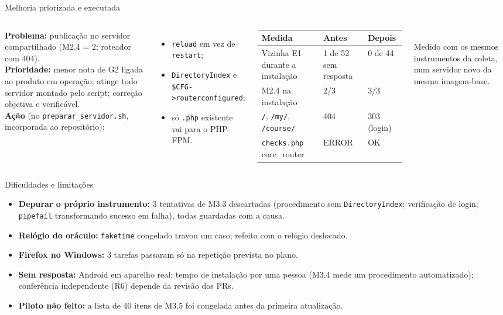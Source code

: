 \documentclass[aspectratio=169,10pt]{beamer}
\begin{document}
\begin{frame}{Melhoria priorizada e executada}
\begin{columns}[T]
\small
\textbf{Problema:} publicação no servidor compartilhado (M2.4 = 2; roteador com 404).\\[0.3em]
\textbf{Prioridade:} menor nota de G2 ligada ao produto em operação; atinge todo servidor montado pelo script; correção objetiva e verificável.\\[0.3em]
\textbf{Ação} (no \texttt{preparar\_servidor.sh}, incorporada ao repositório):
\begin{itemize}\scriptsize
\item \texttt{reload} em vez de \texttt{restart};
\item \texttt{DirectoryIndex} e \texttt{\$CFG->routerconfigured};
\item só \texttt{.php} existente vai para o PHP-FPM.
\end{itemize}
\scriptsize
\begin{tabularx}{\linewidth}{Lp{1.8cm}p{1.8cm}}
\toprule
Medida & Antes & Depois \\
\midrule
Vizinha E1 durante a instalação & 1 de 52 sem resposta & 0 de 44 \\
M2.4 na instalação & 2/3 & 3/3 \\
\texttt{/}, \texttt{/my/}, \texttt{/course/} & 404 & 303 (login) \\
\texttt{checks.php} core\_router & ERROR & OK \\
\bottomrule
\end{tabularx}\\[0.4em]
Medido com os mesmos instrumentos da coleta, num servidor novo da mesma imagem-base.
\end{columns}
\end{frame}

\begin{frame}{Dificuldades e limitações}
\small
\begin{itemize}
\item \textbf{Depurar o próprio instrumento:} 3 tentativas de M3.3 descartadas (procedimento sem \texttt{DirectoryIndex}; verificação de login; \texttt{pipefail} transformando sucesso em falha), todas guardadas com a causa.
\item \textbf{Relógio do oráculo:} \texttt{faketime} congelado travou um caso; refeito com o relógio deslocado.
\item \textbf{Firefox no Windows:} 3 tarefas passaram só na repetição prevista no plano.
\item \textbf{Sem resposta:} Android em aparelho real; tempo de instalação por uma pessoa (M3.4 mede um procedimento automatizado); conferência independente (R6) depende da revisão dos PRs.
\item \textbf{Piloto não feito:} a lista de 40 itens de M3.5 foi congelada antes da primeira atualização.
\end{itemize}
\end{frame}
\end{document}
